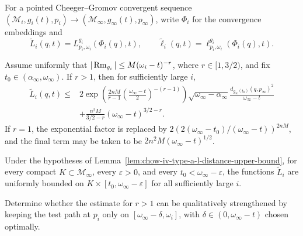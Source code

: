 For a pointed Cheeger--Gromov convergent sequence
\((\mathcal M_i,g_i(t),p_i)\to(\mathcal M_\infty,g_\infty(t),p_\infty)\),
write \(\Phi_i\) for the convergence embeddings and
\[
 \widetilde L_i(q,t)=L^{g_i}_{p_i,\omega_i}(\Phi_i(q),t),
 \qquad
 \widetilde\ell_i(q,t)=\ell^{g_i}_{p_i,\omega_i}(\Phi_i(q),t).
\]

\begin{lemma}
\label{lem:chow-iv-type-a-l-distance-upper-bound}
Assume uniformly that
\(|\operatorname{Rm}_{g_i}|\leq M(\omega_i-t)^{-r}\), where \(r\in[1,3/2)\), and fix
\(t_0\in(\alpha_\infty,\omega_\infty)\).  If \(r>1\), then for sufficiently
large \(i\),
\[
\begin{split}
 \widetilde L_i(q,t)\leq{}&
 2\exp\!\left(\frac{2nM}{r-1}
 \left(\frac{\omega_\infty-t}{2}\right)^{-(r-1)}\right)
 \sqrt{\omega_\infty-\alpha_\infty}
 \frac{d_{g_\infty(t_0)}(q,p_\infty)^2}{\omega_\infty-t}\\
 &+\frac{n^2M}{3/2-r}(\omega_\infty-t)^{3/2-r}.
\end{split}
\]
If \(r=1\), the exponential factor is replaced by
\(2(2(\omega_\infty-t_0)/(\omega_\infty-t))^{2nM}\), and the final term
may be taken to be \(2n^2M(\omega_\infty-t)^{1/2}\).
\end{lemma}

\begin{corollary}
\label{cor:chow-iv-type-a-l-distance-compact-bound}
Under the hypotheses of Lemma~\ref{lem:chow-iv-type-a-l-distance-upper-bound},
for every compact \(K\subset\mathcal M_\infty\), every
\(\varepsilon>0\), and every
\(t_0<\omega_\infty-\varepsilon\), the functions \(\widetilde L_i\) are
uniformly bounded on \(K\times[t_0,\omega_\infty-\varepsilon]\) for all
sufficiently large \(i\).
\end{corollary}

\begin{example}
\label{ex:chow-iv-optimize-type-a-test-path}
Determine whether the estimate for \(r>1\) can be qualitatively strengthened
by keeping the test path at \(p_i\) only on
\([\omega_\infty-\delta,\omega_i]\), with
\(\delta\in(0,\omega_\infty-t)\) chosen optimally.
\end{example}

